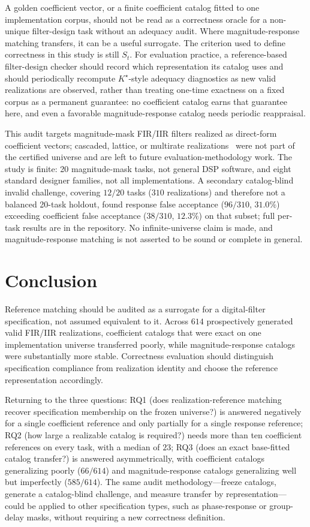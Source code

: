 \documentclass{article}
\begin{document}
A golden coefficient vector, or a finite coefficient catalog
fitted to one implementation corpus, should not be read as a
correctness oracle for a non-unique filter-design task without an
adequacy audit.
Where magnitude-response matching transfers, it can be a useful
surrogate.
The criterion used to define correctness in this study is still
$S_t$.
For evaluation practice, a reference-based filter-design checker
should record which representation its catalog uses and should
periodically recompute $K^\star$-style adequacy diagnostics as new
valid realizations are observed, rather than treating one-time
exactness on a fixed corpus as a permanent guarantee: no coefficient
catalog earns that guarantee here, and even a favorable
magnitude-response catalog needs periodic reappraisal.

This audit targets magnitude-mask FIR/IIR filters realized as
direct-form coefficient vectors; cascaded, lattice, or multirate
realizations~\cite{vaidyanathan1993multirate} were not part of the
certified universe and are left to future evaluation-methodology
work.
The study is finite: 20 magnitude-mask tasks, not general DSP
software, and eight standard designer families, not all
implementations.
A secondary catalog-blind invalid challenge, covering $12/20$ tasks
($310$ realizations) and therefore not a balanced 20-task holdout,
found response false acceptance ($96/310$, $31.0\%$) exceeding
coefficient false acceptance ($38/310$, $12.3\%$) on that subset;
full per-task results are in the repository.
No infinite-universe claim is made, and magnitude-response
matching is not asserted to be sound or complete in general.

\section{Conclusion}
\label{sec:conc}

Reference matching should be audited as a surrogate for a
digital-filter specification, not assumed equivalent to it.
Across $614$ prospectively generated valid FIR/IIR realizations,
coefficient catalogs that were exact on one implementation
universe transferred poorly, while magnitude-response catalogs
were substantially more stable.
Correctness evaluation should distinguish specification
compliance from realization identity and choose the reference
representation accordingly.

Returning to the three questions: RQ1 (does realization-reference
matching recover specification membership on the frozen universe?)
is answered negatively for a single coefficient reference and only
partially for a single response reference; RQ2 (how large a
realizable catalog is required?) needs more than ten coefficient
references on every task, with a median of $23$; RQ3 (does an
exact base-fitted catalog transfer?) is answered asymmetrically,
with coefficient catalogs generalizing poorly ($66/614$) and
magnitude-response catalogs generalizing well but imperfectly
($585/614$).
The same audit methodology---freeze catalogs, generate a
catalog-blind challenge, and measure transfer by representation---
could be applied to other specification types, such as
phase-response or group-delay masks, without requiring a new
correctness definition.
\end{document}
